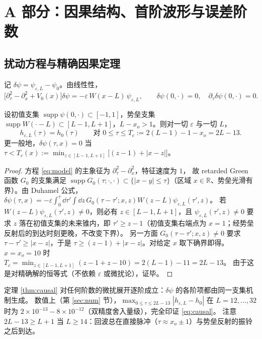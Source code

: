 \section{A 部分：因果结构、首阶波形与误差阶数}
\label{sec:A}

\subsection{扰动方程与精确因果定理}

记 $\delta\psi=\psi_{\varepsilon,L}-\psi_0$。由线性性，
\begin{equation}
\big[\partial_\tau^2-\partial_x^2+V_0(x)\big]\delta\psi=-\varepsilon\,W(x-L)\,\psi_{\varepsilon,L},
\qquad \delta\psi(0,\cdot)=0,\quad\partial_\tau\delta\psi(0,\cdot)=0 .
\label{eq:dsigma}
\end{equation}

\begin{theorem}[因果定理]\label{thm:causal}
设初值支集 $\operatorname{supp}\psi(0,\cdot)\subset[-1,1]$，势垒支集
$\operatorname{supp}W(\cdot-L)\subset[L-1,L+1]$，$L-x_o>1$。则对一切 $\varepsilon$ 与一切 $L$，
\begin{equation}
h_{\varepsilon,L}(\tau)=h_0(\tau)\qquad\text{对 }0\le\tau\le T_c:=2(L-1)-1-x_o=2L-13 .
\label{eq:causal}
\end{equation}
更一般地，$\delta\psi(\tau,x)=0$ 当
$\tau<T_c(x):=\min_{z\in[L-1,L+1]}\big[(z-1)+|x-z|\big]$。
\end{theorem}

\begin{proof}
方程 \eqref{eq:model} 的主象征为 $\partial_\tau^2-\partial_x^2$，特征速度为 $1$，
故 retarded Green 函数 $G_0$ 的支集满足 $\operatorname{supp}G_0(\tau;\cdot,\cdot)
\subset\{|x-y|\le\tau\}$（区域 $x\in\mathbb R$、势垒光滑有界）。由 Duhamel 公式，
$\delta\psi(\tau,x)=-\varepsilon\int_0^\tau\!\dd\tau'\!\int\!\dd z\,
G_0(\tau-\tau';x,z)W(z-L)\psi_{\varepsilon,L}(\tau',z)$。
若 $W(z-L)\psi_{\varepsilon,L}(\tau',z)\ne0$，则必有 $z\in[L-1,L+1]$，且
$\psi_{\varepsilon,L}(\tau',z)\ne0$ 要求 $z$ 落在初值支集的未来锥内，即
$\tau'\ge z-1$（初值支集右端点为 $x=1$；经势垒反射后的到达时刻更晚，不改变下界）。
另一方面 $G_0(\tau-\tau';x,z)\ne0$ 要求 $\tau-\tau'\ge|x-z|$，于是
$\tau\ge(z-1)+|x-z|$。对给定 $x$ 取下确界即得。$x=x_o=10$ 时
$T_c=\min_{z\in[L-1,L+1]}(z-1+z-10)=2(L-1)-11=2L-13$。
由于这是对精确解的恒等式（不依赖 $\varepsilon$ 或微扰论），证毕。
\end{proof}

\begin{remark}
定理 \ref{thm:causal} 对任何阶数的微扰展开逐阶成立：$\delta\psi$ 的各阶项都由同一支集机制生成。
数值上（第 \ref{sec:num} 节），$\max_{0\le\tau\le2L-13}|h_{\varepsilon,L}-h_0|$
在 $L=12,\dots,32$ 时为 $2\times10^{-13}\!-\!8\times10^{-12}$（双精度舍入量级），完全印证 \eqref{eq:causal}。
注意 $2L-13\ge L+1$ 当 $L\ge14$：回波总在直接脉冲（$\tau\approx x_o\pm1$）与势垒反射的振铃之后到达。
\end{remark}

